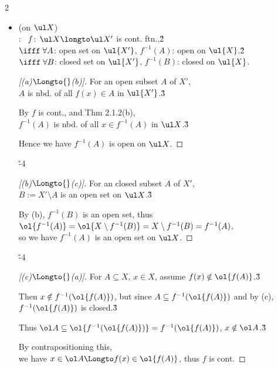 \documentclass[dvipdfmx,a4paper,titlepage,9pt]{jsarticle}
\begin{document}
\begin{multicols*}{2}
\begin{itemize}[label=-]
\item{} {\color{TGreen}(on $\ul X$)}\\
: \qquad\, $f\!:\,\ul X\longto\ul X'$ is cont. ftn.,\v2\\
\;\;$\ifff\;\forall A$: open set on $\ul{X'}$, $f^{-1}(A)$: open on $\ul{X}$.\v2\\
\;\;$\ifff\;\forall B$: closed set on $\ul{X'}$, $f^{-1}(B)$: closed on $\ul{X}$.

\begin{pfbox}
\begin{proof}[{[(a)${}\Longto{}$(b)]}]\rnc{\qedsymbol}{\Sq}
For an open subset $A$ of $X'$, \\
$A$ is nbd. of all $f(x)\in A$ in $\ul{X'}$.\v3

By $f$ is cont., and Thm 2.1.2(b),\\
$f^{-1}(A)$ is nbd. of all $x\in f^{-1}(A)$ in $\ul X$.\v3

Hence we have $f^{-1}(A)$ is open on $\ul X$.
\end{proof}\v{-4}

\dotfill

\begin{proof}[{[(b)${}\Longto{}$(c)]}]\rnc{\qedsymbol}{\Sq}
For an closed subset $A$ of $X'$,\\
$B:=X'\setminus A$ is an open set on $\ul X$.\v3

By (b), $f^{-1}(B)$ is an open set, thus\\
$\ol{f^{-1}(A)}=\ol{X\setminus f^{-1}(B)}=X\setminus f^{-1}(B)=f^{-1}(A)$,\\
so we have $f^{-1}(A)$ is an open set on $\ul X$.
\end{proof}\v{-4}

\dotfill

\begin{proof}[{[(c)${}\Longto{}$(a)]}]
For $A\subseteq X$, $x\in X$, assume $f(x)\notin\ol{f(A)}$.\v3

Then $x\notin f^{-1}(\ol{f(A)})$, but since $A\subseteq f^{-1}(\ol{f(A)})$ and by (c), $f^{-1}(\ol{f(A)})$ is closed.\v3

Thus $\ol A\subseteq\ol{f^{-1}(\ol{f(A)})}=f^{-1}(\ol{f(A)})$, $x\notin\ol A$.\v3

By contrapositioning this,\\
we have $x\in \ol A\Longto f(x)\in\ol{f(A)}$, thus $f$ is cont.
\end{proof}
\end{pfbox}
\end{itemize}


\end{multicols*}
\end{document}
